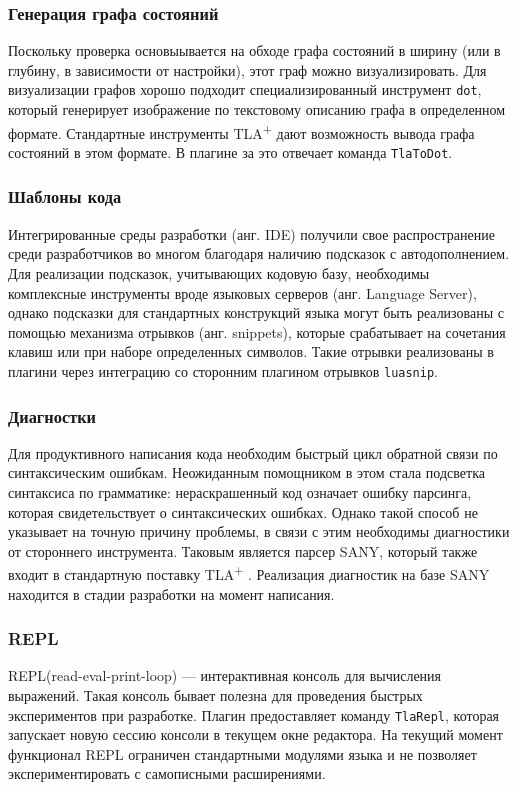 \documentclass[14pt, openany]{report}
\newcommand{\tlapl}{TLA\textsuperscript{+} }
\newcommand{\prog}[1]{\lstinline[style=progStyle]{#1}}
\begin{document}
\subsubsection{Генерация графа состояний}
Поскольку проверка основыывается на обходе графа состояний в ширину (или в глубину, в зависимости от настройки), этот граф можно визуализировать. Для визуализации графов хорошо подходит специализированный инструмент \prog{dot}, который генерирует изображение по текстовому описанию графа в определенном формате. Стандартные инструменты \tlapl дают возможность вывода графа состояний в этом формате. В плагине за это отвечает команда \prog{TlaToDot}.

\subsubsection{Шаблоны кода}
Интегрированные среды разработки (анг. IDE) получили свое распространение среди разработчиков во многом благодаря наличию подсказок с автодополнением. Для реализации подсказок, учитывающих кодовую базу, необходимы комплексные инструменты вроде языковых серверов (анг. Language Server), однако подсказки для стандартных конструкций языка могут быть реализованы с помощью механизма отрывков (анг. snippets), которые срабатывает на сочетания клавиш или при наборе определенных символов. Такие отрывки реализованы в плагини через интеграцию со сторонним плагином отрывков \prog{luasnip}.

\subsubsection{Диагностки}
Для продуктивного написания кода необходим быстрый цикл обратной связи по синтаксическим ошибкам. Неожиданным помощником в этом стала подсветка синтаксиса по грамматике: нераскрашенный код означает ошибку парсинга, которая свидетельствует о синтаксических ошибках. Однако такой способ не указывает на точную причину проблемы, в связи с этим необходимы диагностики от стороннего инструмента. Таковым является парсер SANY, который также входит в стандартную поставку \tlapl. Реализация диагностик на базе SANY находится в стадии разработки на момент написания.

\subsubsection{REPL}
REPL(read-eval-print-loop) --- интерактивная консоль для вычисления выражений. Такая консоль бывает полезна для проведения быстрых экспериментов при разработке. Плагин предоставляет команду \prog{TlaRepl}, которая запускает новую сессию консоли в текущем окне редактора. На текущий момент функционал REPL ограничен стандартными модулями языка и не позволяет экспериментировать с самописными расширениями.
\end{document}
